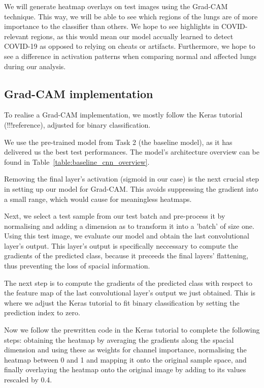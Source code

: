 \documentclass[conference]{IEEEtran}
\begin{document}
We will generate heatmap overlays on test images using the Grad-CAM technique. This way, we will be able to see which regions of the lungs are of more importance to the classifier than others. We hope to see highlights in COVID-relevant regions, as this would mean our model accually learned to detect COVID-19 as opposed to relying on cheats or artifacts. Furthermore, we hope to see a difference in activation patterns when comparing normal and affected lungs during our analysis.

\subsection{Grad-CAM implementation}
To realise a Grad-CAM implementation, we mostly follow the Keras tutorial \cite{keras_gradcam} (!!!reference), adjusted for binary classification.

\vspace{0.5cm} We use the pre-trained model from Task 2 (the baseline model), as it has delivered us the best test performances. The model's architecture overview can be found in Table~\ref{table:baseline_cnn_overview}. 

Removing the final layer's activation (sigmoid in our case) is the next crucial step in setting up our model for Grad-CAM\@. This avoids suppressing the gradient into a small range, which would cause for meaningless heatmaps.

Next, we select a test sample from our test batch and pre-process it by normalising and adding a dimension as to transform it into a 'batch' of size one. Using this test image, we evaluate our model and obtain the last convolutional layer's output. This layer's output is specifically neccessary to compute the gradients of the predicted class, because it preceeds the final layers' flattening, thus preventing the loss of spacial information.

The next step is to compute the gradients of the predicted class with respect to the feature map of the last convolutional layer's output we just obtained. This is where we adjust the Keras tutorial to fit binary classification by setting the prediction index to zero.

Now we follow the prewritten code in the Keras tutorial to complete the following steps: obtaining the heatmap by averaging the gradients along the spacial dimension and using these as weights for channel importance, normalising the heatmap between 0 and 1 and mapping it onto the original sample space, and finally overlaying the heatmap onto the original image by adding to its values rescaled by 0.4.
\end{document}
